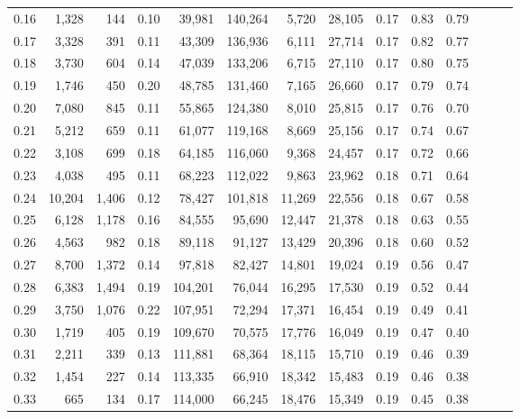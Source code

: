 \begin{tabular}{rrrrrrrrrrrrrr}
0.16 &   1,328 &    144 &  0.10 &   39,981 &  140,264 &   5,720 &  28,105 &  0.17 &  0.83 &      0.79 \\
0.17 &   3,328 &    391 &  0.11 &   43,309 &  136,936 &   6,111 &  27,714 &  0.17 &  0.82 &      0.77 \\
0.18 &   3,730 &    604 &  0.14 &   47,039 &  133,206 &   6,715 &  27,110 &  0.17 &  0.80 &      0.75 \\
0.19 &   1,746 &    450 &  0.20 &   48,785 &  131,460 &   7,165 &  26,660 &  0.17 &  0.79 &      0.74 \\
0.20 &   7,080 &    845 &  0.11 &   55,865 &  124,380 &   8,010 &  25,815 &  0.17 &  0.76 &      0.70 \\
0.21 &   5,212 &    659 &  0.11 &   61,077 &  119,168 &   8,669 &  25,156 &  0.17 &  0.74 &      0.67 \\
0.22 &   3,108 &    699 &  0.18 &   64,185 &  116,060 &   9,368 &  24,457 &  0.17 &  0.72 &      0.66 \\
0.23 &   4,038 &    495 &  0.11 &   68,223 &  112,022 &   9,863 &  23,962 &  0.18 &  0.71 &      0.64 \\
0.24 &  10,204 &  1,406 &  0.12 &   78,427 &  101,818 &  11,269 &  22,556 &  0.18 &  0.67 &      0.58 \\
0.25 &   6,128 &  1,178 &  0.16 &   84,555 &   95,690 &  12,447 &  21,378 &  0.18 &  0.63 &      0.55 \\
0.26 &   4,563 &    982 &  0.18 &   89,118 &   91,127 &  13,429 &  20,396 &  0.18 &  0.60 &      0.52 \\
0.27 &   8,700 &  1,372 &  0.14 &   97,818 &   82,427 &  14,801 &  19,024 &  0.19 &  0.56 &      0.47 \\
0.28 &   6,383 &  1,494 &  0.19 &  104,201 &   76,044 &  16,295 &  17,530 &  0.19 &  0.52 &      0.44 \\
0.29 &   3,750 &  1,076 &  0.22 &  107,951 &   72,294 &  17,371 &  16,454 &  0.19 &  0.49 &      0.41 \\
0.30 &   1,719 &    405 &  0.19 &  109,670 &   70,575 &  17,776 &  16,049 &  0.19 &  0.47 &      0.40 \\
0.31 &   2,211 &    339 &  0.13 &  111,881 &   68,364 &  18,115 &  15,710 &  0.19 &  0.46 &      0.39 \\
0.32 &   1,454 &    227 &  0.14 &  113,335 &   66,910 &  18,342 &  15,483 &  0.19 &  0.46 &      0.38 \\
0.33 &     665 &    134 &  0.17 &  114,000 &   66,245 &  18,476 &  15,349 &  0.19 &  0.45 &      0.38 \\

\end{tabular}
